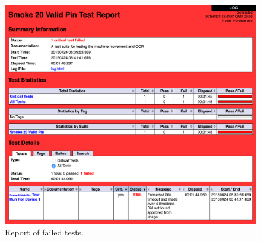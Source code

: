 \begin{figure}[ht]
  \begin{center}
    \includegraphics[width=\textwidth]{images/failed_report.png}
    \caption{Report of failed tests.}
    \label{fig:failed report}
  \end{center}
\end{figure}
\FloatBarrier